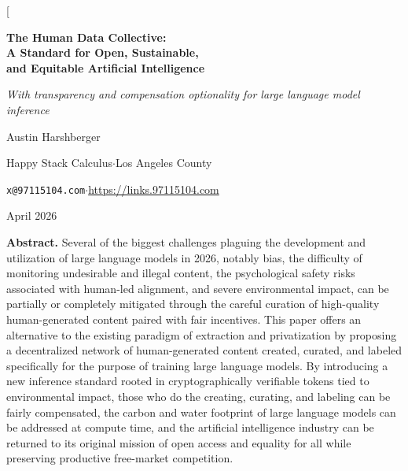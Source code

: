 \documentclass[10pt,a4paper,twocolumn]{article}
\begin{document}
\twocolumn[{%
\begin{center}
{\LARGE\bfseries The Human Data Collective:\\[3pt]A Standard for Open, Sustainable,\\[2pt]and Equitable Artificial Intelligence\par}
\vspace{6pt}
{\normalsize\itshape With transparency and compensation optionality for large language model inference\par}
\vspace{10pt}
{\large Austin Harshberger\par}
\vspace{2pt}
{\small Happy Stack Calculus\quad$\cdot$\quad Los Angeles County\par}
{\small \texttt{x@97115104.com}\quad$\cdot$\quad \url{https://links.97115104.com}\par}
\vspace{4pt}
{\small April 2026\par}
\end{center}

\vspace{10pt}
\begin{center}
\begin{minipage}{0.92\textwidth}
\small\textbf{Abstract.}\quad
Several of the biggest challenges plaguing the development and utilization of large language models in 2026, notably bias, the difficulty of monitoring undesirable and illegal content, the psychological safety risks associated with human-led alignment, and severe environmental impact, can be partially or completely mitigated through the careful curation of high-quality human-generated content paired with fair incentives. This paper offers an alternative to the existing paradigm of extraction and privatization by proposing a decentralized network of human-generated content created, curated, and labeled specifically for the purpose of training large language models. By introducing a new inference standard rooted in cryptographically verifiable tokens tied to environmental impact, those who do the creating, curating, and labeling can be fairly compensated, the carbon and water footprint of large language models can be addressed at compute time, and the artificial intelligence industry can be returned to its original mission of open access and equality for all while preserving productive free-market competition.
\end{minipage}
\end{center}

}
\end{document}
